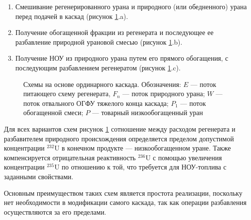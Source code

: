 \begin{enumerate}
  \item Смешивание регенерированного урана и природного (или обедненного) урана перед подачей в каскад (рисунок \ref{fig:diagram1}.a).
  \item Получение обогащенной фракции из регенерата и последующее ее разбавление природной урановой смесью (рисунок \ref{fig:diagram1}.b).
  \item Получение НОУ из природного урана путем его прямого обогащения, с последующим разбавлением регенератом (рисунок \ref{fig:diagram1}.c).
\end{enumerate}

\begin{figure}[ht]
  \caption{Схемы на основе ординарного каскада. Обозначения: $E$ --- поток питающего схему регенерата, $F_n$ --- поток природного урана; $W$ --- поток отвального ОГФУ тяжелого конца каскада; $P_1$ --- поток обогащенной смеси; $P$ --- товарный низкообогащенный уран}\label{fig:diagram1}
\end{figure}

Для всех вариантов схем рисунок \ref{fig:diagram1} сотношение между расходом регенерата и разбавителем природного происхождения определяется пределом допустимой концентрации $^{232}$U в конечном продукте --- низкообогащенном уране. Также компенсируется отрицательная реактивность $^{236}$U с помощью увеличения концентрации $^{235}$U по отношению к той, что требуется для НОУ-топлива с заданными свойствами.

Основным преимуществом таких схем является простота реализации, поскольку нет необходимости в модификации самого каскада, так как операции разбавления осуществляются за его пределами.

